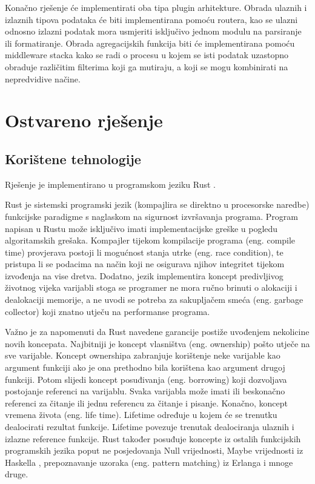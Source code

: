 \documentclass[times, utf8, zavrsni]{fer}
\begin{document}
Konačno rješenje će implementirati
oba tipa plugin arhitekture. Obrada ulaznih i izlaznih tipova podataka će biti
implementirana pomoću routera, kao se ulazni odnosno izlazni podatak mora
usmjeriti isključivo jednom modulu na parsiranje ili formatiranje. Obrada
agregacijskih funkcija biti će implementirana pomoću middleware stacka kako se
radi o procesu u kojem se isti podatak uzastopno obraduje različitim filterima
koji ga mutiraju, a koji se mogu kombinirati na nepredvidive načine.

\chapter{Ostvareno rješenje}

\section{Korištene tehnologije}

Rješenje je implementirano u programskom jeziku Rust \cite{rust_lang_page}.

Rust je sistemski programski jezik (kompajlira se direktno u procesorske
naredbe) funkcijske paradigme s naglaskom na sigurnost izvršavanja programa.
Program napisan u Rustu može isključivo imati implementacijske greške u pogledu
algoritamskih grešaka. Kompajler tijekom kompilacije programa (eng. compile
time) provjerava postoji li mogućnost stanja utrke (eng. race condition), te
pristupa li se podacima na način koji ne osigurava njihov integritet tijekom
izvođenja na vise dretva. Dodatno, jezik implementira koncept predivljivog
životnog vijeka varijabli stoga se programer ne mora ručno brinuti o alokaciji
i dealokaciji memorije, a ne uvodi se potreba za sakupljačem smeća (eng.
garbage collector) koji znatno utječu na performanse programa.

Važno je za napomenuti da Rust navedene garancije postiže uvođenjem nekolicine
novih koncepata. Najbitniji je koncept vlasništva (eng. ownership) pošto utječe
na sve varijable. Koncept ownershipa zabranjuje korištenje neke varijable kao
argument funkciji ako je ona prethodno bila korištena kao argument drugoj
funkciji. Potom slijedi koncept posuđivanja (eng. borrowing) koji dozvoljava
postojanje referenci na varijablu. Svaka varijabla može imati ili beskonačno
referenci za čitanje ili jednu referencu za čitanje i pisanje. Konačno, koncept
vremena života (eng. life time). Lifetime određuje u kojem će se trenutku
dealocirati rezultat funkcije. Lifetime povezuje trenutak dealociranja ulaznih i
izlazne reference funkcije. Rust također posuđuje koncepte iz ostalih
funkcijskih programskih jezika poput ne posjedovanja Null vrijednosti, Maybe
vrijednosti iz Haskella \cite{haskell_lang_page}, prepoznavanje uzoraka
(eng. pattern matching) iz Erlanga \cite{erlang_lang_page} i mnoge druge.
\end{document}
